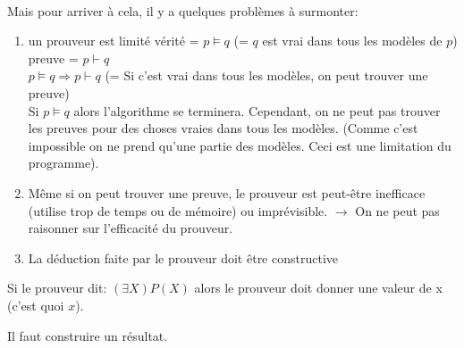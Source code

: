 \paragraph{}
Mais pour arriver à cela, il y a quelques problèmes à surmonter:
\begin{enumerate}\renewcommand {\theenumi }{\alph {enumi}}
	\item un prouveur est limité
		vérité = $ p \models q $ (= $ q $ est vrai dans tous les modèles de $ p $)\\
		preuve = $ p  \vdash q $ \\
		$ p \models q \Rightarrow p \vdash q $ (= Si c’est vrai dans tous les modèles, on peut trouver une preuve)\\
		Si $ p \models q $ alors l’algorithme se terminera. Cependant, on ne peut pas trouver les preuves pour des choses vraies dans tous les modèles. (Comme c’est impossible on ne prend qu’une partie des modèles. Ceci est une limitation du programme).
		
		\item Même si on peut trouver une preuve, le prouveur est peut-être inefficace (utilise trop de temps ou de mémoire) ou imprévisible. $ \to $ On ne peut pas raisonner sur l’efficacité du prouveur.
		
		\item La déduction faite par le prouveur doit être constructive  
\end{enumerate}

		Si le prouveur dit: $ (\exists X) P(X) $  alors le prouveur doit donner une valeur de x (c’est quoi $ x $).



Il faut construire un résultat.

